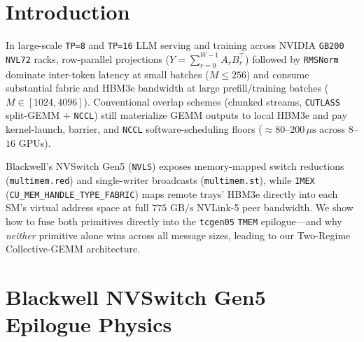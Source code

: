\documentclass[conference,10pt]{IEEEtran}
\begin{document}
\begin{abstract}
\begin{enumerate}
\end{enumerate}
On live $4$-tray \textbf{$16{\times}$\texttt{GB200} IMEX} (\texttt{TP=16}, $[M,512]{\times}[512,8192]$), our Two-Regime engine beats \texttt{cuBLAS + NCCL16 + RMSNorm} at \emph{every} batch size $M \in [16, 4096]$ by \textbf{$1.40\times$--$10.72\times$} ($24.0$ vs.\ $257.1\,\mu\text{s}$ at $M{=}16$; $267.6$ vs.\ $374.7\,\mu\text{s}$ at $M{=}4096$, $64\text{ MiB}$), and beats \texttt{cuBLAS + NCCL16 ReduceScatter} at every $M$ by \textbf{$2.33\times$--$6.40\times$}.
\end{abstract}

\section{Introduction}
In large-scale \texttt{TP=8} and \texttt{TP=16} LLM serving and training across NVIDIA \texttt{GB200 NVL72} racks, row-parallel projections ($Y = \sum_{r=0}^{W-1} A_r B_r^\top$) followed by \texttt{RMSNorm} dominate inter-token latency at small batches ($M \le 256$) and consume substantial fabric and HBM3e bandwidth at large prefill/training batches ($M \in [1024, 4096]$). Conventional overlap schemes (chunked streams, \texttt{CUTLASS} split-GEMM + \texttt{NCCL}) still materialize GEMM outputs to local HBM3e and pay kernel-launch, barrier, and \texttt{NCCL} software-scheduling floors ($\approx 80$--$200\,\mu\text{s}$ across $8$--$16$ GPUs).

Blackwell's NVSwitch Gen5 (\texttt{NVLS}) exposes memory-mapped switch reductions (\texttt{multimem.red}) and single-writer broadcasts (\texttt{multimem.st}), while \texttt{IMEX} (\texttt{CU\_MEM\_HANDLE\_TYPE\_FABRIC}) maps remote trays' HBM3e directly into each SM's virtual address space at full $775\text{ GB/s}$ NVLink-5 peer bandwidth. We show how to fuse both primitives directly into the \texttt{tcgen05} \texttt{TMEM} epilogue---and why \emph{neither} primitive alone wins across all message sizes, leading to our Two-Regime Collective-GEMM architecture.

\section{Blackwell NVSwitch Gen5 Epilogue Physics}
\end{document}
